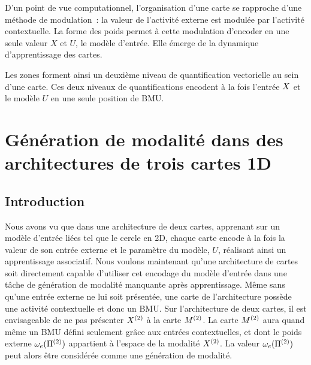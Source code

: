 \documentclass[../main]{subfiles}
\begin{document}
D'un point de vue computationnel, l'organisation d'une carte se rapproche d'une méthode de modulation~: la valeur de l'activité externe est modulée par l'activité contextuelle. 
La forme des poids permet à cette modulation d'encoder en une seule valeur $X$ et $U$, le modèle d'entrée. Elle émerge de la dynamique d'apprentissage des cartes.

Les zones forment ainsi un deuxième niveau de quantification vectorielle au sein d'une carte. 
Ces deux niveaux de quantifications encodent à la fois l'entrée $X$ et le modèle $U$ en une seule position de BMU.

\section{Génération de modalité dans des architectures de trois cartes 1D}

\subsection{Introduction}

Nous avons vu que dans une architecture de deux cartes, apprenant sur un modèle d'entrée liées tel que le cercle en 2D, chaque carte encode à la fois la valeur de son entrée externe et le paramètre du modèle, $U$, réalisant ainsi un apprentissage associatif. 
Nous voulons maintenant qu'une architecture de cartes soit directement capable d'utiliser cet encodage du modèle d'entrée dans une tâche de génération de modalité manquante après apprentissage.
Même sans qu'une entrée externe ne lui soit présentée, une carte de l'architecture possède une activité contextuelle et donc un BMU. 
Sur l'architecture de deux cartes, il est envisageable de ne pas présenter $X^{({2})}$ à la carte $M^{({2})}$. La carte $M^{({2})}$ aura quand même un BMU défini seulement grâce aux entrées contextuelles, et dont le poids externe $\omega_e(\Pi^{({2})})$ appartient à l'espace de la modalité $X^{({2})}$. 
La valeur $\omega_e(\Pi^{({2})})$ peut alors être considérée comme une génération de modalité. 
\end{document}
